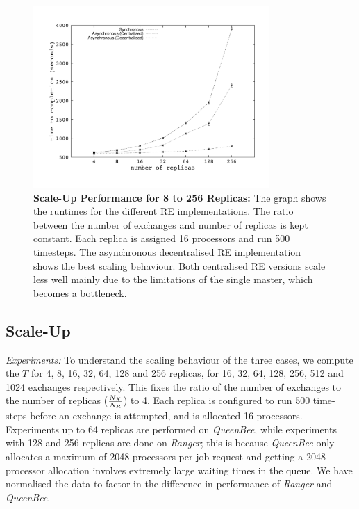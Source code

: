 \documentclass{rspublic}
\newcommand{\alnote}[1]{ {\textcolor{blue} { ***andre: #1 }}}
\newcommand{\athotanote}[1]{ {\textcolor{green} { ***athota: #1 }}}
\newcommand{\alnote}[1]{}
\newcommand{\athotanote}[1]{}
\begin{document}
%
\begin{figure}
\centering
\includegraphics[width=0.8\textwidth]{../data/scale_up.pdf}
\caption{\small \textbf{Scale-Up Performance for 8 to 256 Replicas:}
  The graph shows the runtimes for the different RE implementations.
  The ratio between the number of exchanges and number of replicas is
  kept constant. Each replica is assigned 16 processors and run 500
  timesteps.  The asynchronous decentralised RE implementation shows
  the best scaling behaviour. Both centralised RE versions scale less
  well mainly due to the limitations of the single master, which
  becomes a
  bottleneck.}%
\label{fig:scaleup}
\vspace{-1em}
\end{figure}


\subsection{Scale-Up}


{\it Experiments: } To understand the scaling behaviour of the three
cases, we compute the $T$ for 4, 8, 16, 32, 64, 128 and 256 replicas,
for 16, 32, 64, 128, 256, 512 and 1024 exchanges respectively. This
fixes the ratio of the number of exchanges to the number of replicas
($N_X \over N_R$) to 4.  Each replica is configured to run 500 time-steps
before an exchange is attempted, and is allocated 16
processors. Experiments up to 64 replicas are performed on {\it
  QueenBee}, while experiments with 128 and 256 replicas are done on
\emph{Ranger}; this is because \emph{QueenBee} only allocates a
maximum of 2048 processors per job request and getting a 2048 processor allocation involves extremely large waiting times in the queue. We have normalised the data to factor in the difference in performance of {\it Ranger} and {\it QueenBee}.
\end{document}
